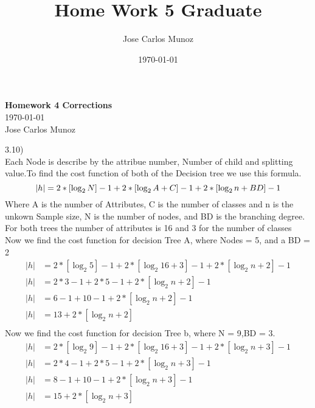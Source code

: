 \documentclass[12pt,english]{article}
\title{Home Work 5 Graduate}
\date{\today}
\author{Jose Carlos Munoz}
\begin{document}
\begin{center}
    \Large
    \textbf{Homework 4 Corrections}\\
    \small
    \today\\
    \large
    Jose Carlos Munoz
\end{center}%
3.10)\\
Each Node is describe by the attribue number, Number of child and splitting value.To find the cost function of both of the Decision tree we use this formula.
\begin{equation}
|h| = 2*\left[ \log_{2}N \right] -1 + 2 * \left [ \log_{2}A + C \right] -1+ 2 * \left [ \log_{2}n + BD \right] -1 \\
\end{equation}
Where A is the number of Attributes, C is the number of classes and n is the unkown Sample size, N is the number of nodes, and BD is the branching degree. For both trees the number of attributes is 16 and 3 for the number of classes\\
Now we find the cost function for decision Tree A, where Nodes = 5, and a BD = 2\\
\begin{equation}\tag{a}\label{eq:a}
\begin{split}
|h| &= 2*\left[ \log_{2}5 \right] -1 + 2 * \left [ \log_{2}16 + 3 \right] -1+ 2 * \left [ \log_{2}n + 2 \right] -1 \\
|h| &= 2 * 3 - 1 + 2 *5-1 + 2 * \left [ \log_{2}n + 2 \right] -1 \\
|h| &= 6-1 + 10-1 + 2 * \left [ \log_{2}n + 2 \right] -1 \\
|h|  &= 13 + 2 * \left [ \log_{2}n + 2 \right]\\
\end{split}
\end{equation}
Now we find the cost function for decision Tree b, where N = 9,BD = 3.
\begin{equation}\tag{b}\label{eq:b}
\begin{split}
|h| &= 2*\left[ \log_{2}9 \right] -1 + 2 * \left [ \log_{2}16 + 3 \right] -1+ 2 * \left [ \log_{2}n + 3 \right] -1 \\
|h| &= 2 * 4 - 1 + 2 *5-1 + 2 * \left [ \log_{2}n + 3 \right] -1 \\
|h| &= 8-1 + 10-1 + 2 * \left [ \log_{2}n + 3 \right] -1 \\
|h|  &= 15 + 2 * \left [ \log_{2}n + 3 \right]\\
\end{split}
\end{equation}
\end{document}
